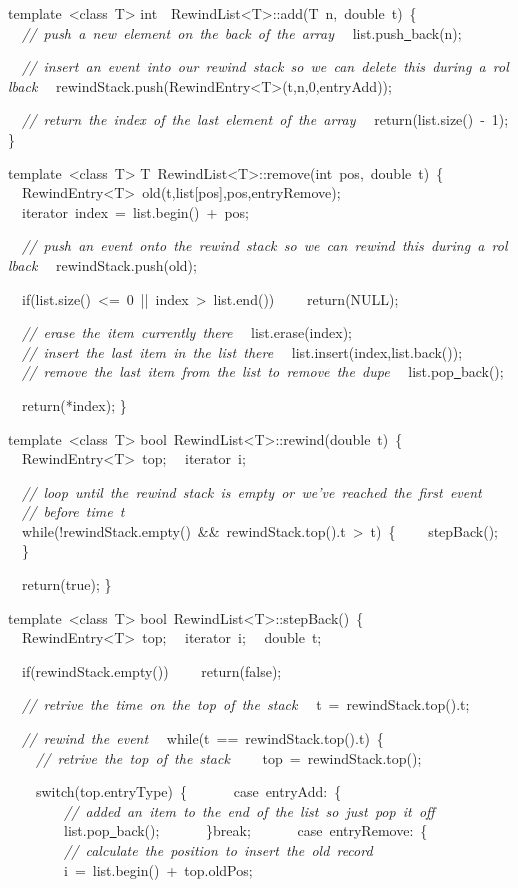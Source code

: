{template\ <{}class\ T>{}
int\ \ RewindList<{}T>{}::add(T\ n,\ double\ t)\ \{
\ \ \textsl{//\ push\ a\ new\ element\ on\ the\ back\ of\ the\ array}
\ \ list.push\underline\ back(n);

\ \ \textsl{//\ insert\ an\ event\ into\ our\ rewind\ stack\ so\ we\ can\ delete\ this\ during\ a\ rollback}
\ \ rewindStack.push(RewindEntry<{}T>{}(t,n,0,entryAdd));

\ \ \textsl{//\ return\ the\ index\ of\ the\ last\ element\ of\ the\ array}
\ \ return(list.size()\ -{}\ 1);
\}

template\ <{}class\ T>{}
T\ RewindList<{}T>{}::remove(int\ pos,\ double\ t)\ \{
\ \ RewindEntry<{}T>{}\ old(t,list[pos],pos,entryRemove);
\ \ iterator\ index\ =\ list.begin()\ +\ pos;

\ \ \textsl{//\ push\ an\ event\ onto\ the\ rewind\ stack\ so\ we\ can\ rewind\ this\ during\ a\ rollback}
\ \ rewindStack.push(old);

\ \ if(list.size()\ <{}=\ 0\ ||\ index\ >{}\ list.end())
\ \ \ \ return(NULL);

\ \ \textsl{//\ erase\ the\ item\ currently\ there}
\ \ list.erase(index);
\ \ \textsl{//\ insert\ the\ last\ item\ in\ the\ list\ there}
\ \ list.insert(index,list.back());
\ \ \textsl{//\ remove\ the\ last\ item\ from\ the\ list\ to\ remove\ the\ dupe}
\ \ list.pop\underline\ back();

\ \ return(*index);
\}

template\ <{}class\ T>{}
bool\ RewindList<{}T>{}::rewind(double\ t)\ \{
\ \ RewindEntry<{}T>{}\ top;
\ \ iterator\ i;

\ \ \textsl{//\ loop\ until\ the\ rewind\ stack\ is\ empty\ or\ we've\ reached\ the\ first\ event}
\ \ \textsl{//\ before\ time\ t}
\ \ while(!rewindStack.empty()\ \&\&\ rewindStack.top().t\ >{}\ t)\ \{
\ \ \ \ stepBack();
\ \ \}

\ \ return(true);
\}

template\ <{}class\ T>{}
bool\ RewindList<{}T>{}::stepBack()\ \{
\ \ RewindEntry<{}T>{}\ top;
\ \ iterator\ i;
\ \ double\ t;

\ \ if(rewindStack.empty())
\ \ \ \ return(false);

\ \ \textsl{//\ retrive\ the\ time\ on\ the\ top\ of\ the\ stack}
\ \ t\ =\ rewindStack.top().t;

\ \ \textsl{//\ rewind\ the\ event}
\ \ while(t\ ==\ rewindStack.top().t)\ \{
\ \ \ \ \textsl{//\ retrive\ the\ top\ of\ the\ stack}
\ \ \ \ top\ =\ rewindStack.top();

\ \ \ \ switch(top.entryType)\ \{
\ \ \ \ \ \ case\ entryAdd:\ \{
\ \ \ \ \ \ \ \ \textsl{//\ added\ an\ item\ to\ the\ end\ of\ the\ list\ so\ just\ pop\ it\ off}
\ \ \ \ \ \ \ \ list.pop\underline\ back();
\ \ \ \ \ \ \}break;
\ \ \ \ \ \ case\ entryRemove:\ \{
\ \ \ \ \ \ \ \ \textsl{//\ calculate\ the\ position\ to\ insert\ the\ old\ record}
\ \ \ \ \ \ \ \ i\ =\ list.begin()\ +\ top.oldPos;

}
